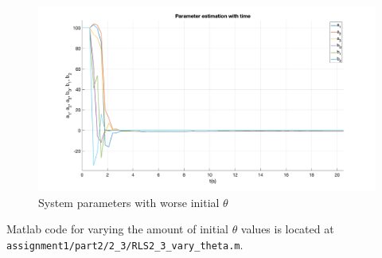 \begin{figure}
	\centering
	\includegraphics[totalheight=8cm]{images/EICWorseThetaParams.png}
	\caption{System parameters with worse initial $\theta$}
	\label{fig:EICWorseThetaParams}
\end{figure}

Matlab code for varying the amount of initial $\theta$ values is located at   \hspace{-1ex}\lstinline| assignment1/part2/2_3/RLS2_3_vary_theta.m|.
